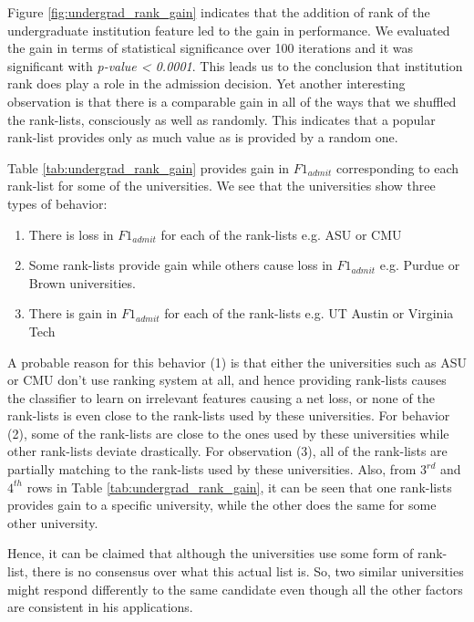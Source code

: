 \documentclass{sig-alternate-05-2015}
\begin{document}
Figure \ref{fig:undergrad_rank_gain} indicates that the addition of rank of the undergraduate institution feature led to the gain in performance. We evaluated the gain in terms of statistical significance over 100 iterations and it was significant with \textit{p-value < 0.0001}. This leads us to the conclusion that institution rank does play a role in the admission decision. Yet another interesting observation is that there is a comparable gain in all of the ways that we shuffled the rank-lists, consciously as well as randomly. This indicates that a popular rank-list provides only as much value as is provided by a random one.

Table \ref{tab:undergrad_rank_gain} provides gain in $F1_{admit}$ corresponding to each rank-list for some of the universities. We see that the universities show three types of behavior:
\begin{enumerate}
\item There is loss in $F1_{admit}$ for each of the rank-lists e.g. ASU or CMU
\item Some rank-lists provide gain while others cause loss in $F1_{admit}$ e.g. Purdue or Brown universities.
\item There is gain in $F1_{admit}$ for each of the rank-lists e.g. UT Austin or Virginia Tech
\end{enumerate}

A probable reason for this behavior (1) is that either the universities such as ASU or CMU don't use ranking system at all, and hence providing rank-lists causes the classifier to learn on irrelevant features causing a net loss, or none of the rank-lists is even close to the rank-lists used by these universities. For behavior (2), some of the rank-lists are close to the ones used by these universities while other rank-lists deviate drastically. For observation (3), all of the rank-lists are partially matching to the rank-lists used by these universities. Also, from $3^{rd}$ and $4^{th}$ rows in Table \ref{tab:undergrad_rank_gain}, it can be seen that one rank-lists provides gain to a specific university, while the other does the same for some other university.

Hence, it can be claimed that although the universities use some form of rank-list, there is no consensus over what this actual list is. So, two similar universities might respond differently to the same candidate even though all the other factors are consistent in his applications.
\end{document}
